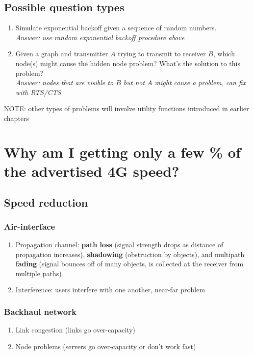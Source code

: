 \documentclass{article}
\begin{document}
\subsection{Possible question types}

\begin{enumerate}
\item Simulate exponential backoff given a sequence of random numbers. \\
\textit{Answer: use random exponential backoff procedure above}
\item Given a graph and transmitter $A$ trying to transmit to receiver $B$, which node(s) might cause the hidden node problem? What's the solution to this problem? \\
\textit{Answer: nodes that are visible to $B$ but not $A$ might cause a problem, can fix with RTS/CTS}
\end{enumerate}
NOTE: other types of problems will involve utility functions introduced in earlier chapters

\section{Why am I getting only a few \% of the advertised 4G speed?}

\subsection{Speed reduction}

\subsubsection{Air-interface}

\begin{enumerate}
\item Propagation channel: \textbf{path loss} (signal strength drops as distance of propagation increases), \textbf{shadowing} (obstruction by objects), and multipath \textbf{fading} (signal bounces off of many objects, is collected at the receiver from multiple paths)
\item Interference: users interfere with one another, near-far problem
\end{enumerate}

\subsubsection{Backhaul network}
\begin{enumerate}
\item Link congestion (links go over-capacity)
\item Node problems (servers go over-capacity or don't work fast)
\end{enumerate}
\end{document}
